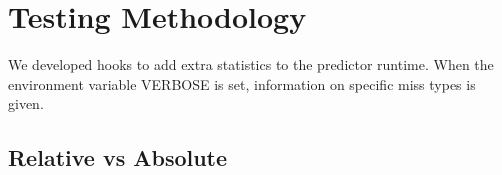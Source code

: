 \section{Testing Methodology}
We developed hooks to add extra statistics to the predictor runtime. When the environment variable VERBOSE is set, information on specific miss types is given. 

\subsection{Relative vs Absolute}
